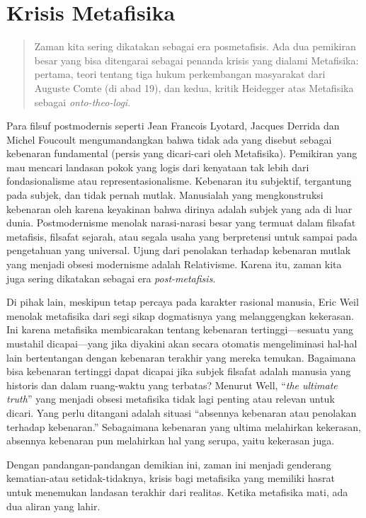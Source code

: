 \documentclass[11pt,twoside,a5paper,openany]{memoir}
\begin{document}
\hypertarget{krisis-metafisika}{%
\section{Krisis Metafisika}\label{krisis-metafisika}}

\begin{quote}
Zaman kita sering dikatakan sebagai era posmetafisis. Ada dua pemikiran
besar yang bisa ditengarai sebagai penanda krisis yang dialami
Metafisika: pertama, teori tentang tiga hukum perkembangan masyarakat
dari Auguste Comte (di abad 19), dan kedua, kritik Heidegger atas
Metafisika sebagai \emph{onto-theo-logi}.
\end{quote}

Para filsuf postmodernis seperti Jean Francois Lyotard, Jacques Derrida
dan Michel Foucoult mengumandangkan bahwa tidak ada yang disebut sebagai
kebenaran fundamental (persis yang dicari-cari oleh Metafisika).
Pemikiran yang mau mencari landasan pokok yang logis dari kenyataan tak
lebih dari fondasionalisme atau representasionalisme. Kebenaran itu
subjektif, tergantung pada subjek, dan tidak pernah mutlak. Manusialah
yang mengkonstruksi kebenaran oleh karena keyakinan bahwa dirinya adalah
subjek yang ada di luar dunia. Postmodernisme menolak narasi-narasi
besar yang termuat dalam filsafat metafisis, filsafat sejarah, atau
segala usaha yang berpretensi untuk sampai pada pengetahuan yang
universal. Ujung dari penolakan terhadap kebenaran mutlak yang menjadi
obsesi modernisme adalah Relativisme. Karena itu, zaman kita juga sering
dikatakan sebagai era \emph{post-metafisis}.

Di pihak lain, meskipun tetap percaya pada karakter rasional manusia,
Eric Weil menolak metafisika dari segi sikap dogmatisnya yang
melanggengkan kekerasan. Ini karena metafisika membicarakan tentang
kebenaran tertinggi---sesuatu yang mustahil dicapai---yang jika diyakini
akan secara otomatis mengeliminasi hal-hal lain bertentangan dengan
kebenaran terakhir yang mereka temukan. Bagaimana bisa kebenaran
tertinggi dapat dicapai jika subjek filsafat adalah manusia yang
historis dan dalam ruang-waktu yang terbatas? Menurut Well, ``\emph{the
ultimate truth}'' yang menjadi obsesi metafisika tidak lagi penting atau
relevan untuk dicari. Yang perlu ditangani adalah situasi ``absennya
kebenaran atau penolakan terhadap kebenaran.'' Sebagaimana kebenaran
yang ultima melahirkan kekerasan, absennya kebenaran pun melahirkan hal
yang serupa, yaitu kekerasan juga.

Dengan pandangan-pandangan demikian ini, zaman ini menjadi genderang
kematian-atau setidak-tidaknya, krisis bagi metafisika yang memiliki
hasrat untuk menemukan landasan terakhir dari realitas. Ketika
metafisika mati, ada dua aliran yang lahir.
\end{document}
